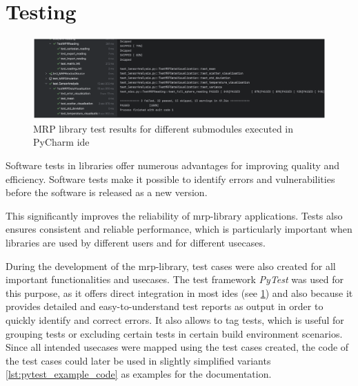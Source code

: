 \hypertarget{testing}{%
\section{Testing}\label{testing}}

\begin{figure}
\centering
\includegraphics{./generated_images/border_MRP_library_test_results_for_different_submodules_executed_in_PyCharm_(+ide).png}
\caption{MRP library test results for different submodules executed in
PyCharm \gls{ide}
\label{MRP_library_test_results_for_different_submodules_executed_in_PyCharm_(+ide).png}}
\end{figure}

Software tests in libraries offer numerous advantages for improving
quality and efficiency. Software tests make it possible to identify
errors and vulnerabilities before the software is released as a new
version.

This significantly improves the reliability of \gls{mrp}-library
applications. Tests also ensures consistent and reliable performance,
which is particularly important when libraries are used by different
users and for different usecases.

During the development of the \gls{mrp}-library, test cases were also
created for all important functionalities and usecases. The test
framework \emph{PyTest} \cite{PyTest} was used for this purpose, as
it offers direct integration in most \gls{ide}s (see
\ref{MRP_library_test_results_for_different_submodules_executed_in_PyCharm_(+ide).png})
and also because it provides detailed and easy-to-understand test
reports as output in order to quickly identify and correct errors. It
also allows to tag tests, which is useful for grouping tests or
excluding certain tests in certain build environment scenarios. Since
all intended usecases were mapped using the test cases created, the code
of the test cases could later be used in slightly simplified variants
\ref{lst:pytest_example_code} as examples for the documentation.

